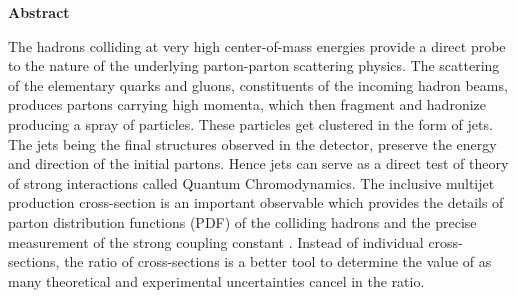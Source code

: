 \begin{center}
{\bf \huge Abstract}
\end{center}

The hadrons colliding at very high center-of-mass energies provide a direct probe to the nature of the underlying parton-parton scattering physics. The scattering of the elementary quarks and gluons, constituents of the incoming hadron beams, produces partons carrying high momenta, which then fragment and hadronize producing a spray of particles. These particles get clustered in the form of jets. The jets being the final structures observed in the detector, preserve the energy and direction of the initial partons. Hence jets can serve as a direct test of theory of strong interactions called Quantum Chromodynamics. The inclusive multijet production cross-section is an important observable which provides the details of parton distribution functions (PDF) of the colliding hadrons and the precise measurement of the strong coupling constant \alps. Instead of individual cross-sections, the ratio of cross-sections is a better tool to determine the value of \alps as many theoretical and experimental uncertainties cancel in the ratio.

